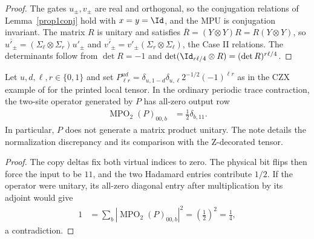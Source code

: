 \begin{proof}
    \leanok
    The gates $u_\pm,v_\pm$ are real and orthogonal, so the conjugation
    relations of Lemma~\ref{prop1conj} hold with $x=y=\Id$, and the MPU is
    conjugation invariant. The matrix $R$ is unitary and satisfies
    $\overline R=(Y\otimes Y)R=R(Y\otimes Y)$, so
    $\overline{u'_\pm}=(\Sigma_\ell\otimes\Sigma_r)u'_\pm$ and
    $\overline{v'_\pm}=v'_\pm(\Sigma_r\otimes\Sigma_\ell)$, the Case II
    relations. The determinants follow from $\det R=-1$ and
    $\det(\Id_{r\ell/4}\otimes R)=(\det R)^{r\ell/4}$.
\end{proof}

\begin{lemma}
    \label{thm:czx_printed_normalization_obstruction}
    \leanok
    Let $u,d,\ell,r\in\{0,1\}$ and set
    $P^{ud}_{\ell r}=\delta_{u,1-d}\delta_{u,\ell}2^{-1/2}(-1)^{\ell r}$
    as in the CZX example of \cite{Cirac2017MPU} for the printed local tensor.
    In the ordinary periodic trace contraction, the two-site operator
    generated by $P$ has all-zero output row
    \begin{align}
        \operatorname{MPO}_2(P)_{00,b} & =\tfrac12\delta_{b,11}.
    \end{align}
    In particular, $P$ does not generate a matrix product unitary.
    The note \cite{gap:mpu_czx_tensor_normalization} details the normalization discrepancy and its comparison with the Z-decorated
    tensor.
\end{lemma}
\begin{proof}
    \leanok
    The copy deltas fix both virtual indices to zero. The physical bit
    flips then force the input to be $11$, and the two Hadamard entries
    contribute $1/2$. If the operator were unitary, its all-zero diagonal
    entry after multiplication by its adjoint would give
    \begin{align}
        1 & =\sum_b\left|\operatorname{MPO}_2(P)_{00,b}\right|^2
        =\left(\tfrac12\right)^2=\tfrac14,
    \end{align}
    a contradiction.
\end{proof}

